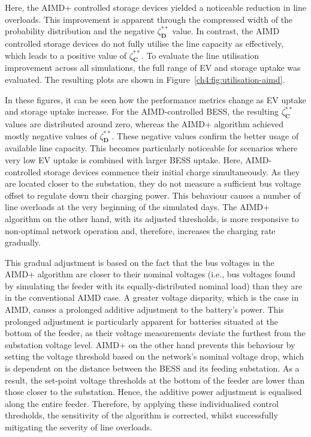 Here, the AIMD+ controlled storage devices yielded a noticeable reduction in line overloads. This improvement is apparent through the compressed width of the probability distribution and the negative $\zeta_\textbf{D}^{**}$ value. In contrast, the AIMD controlled storage devices do not fully utilise the line capacity as effectively, which leads to a positive value of $\zeta_\textbf{C}^{**}$. To evaluate the line utilisation improvement across all simulations, the full range of EV and storage uptake was evaluated. The resulting plots are shown in Figure~\ref{ch4:fig:utilisation-aimd}.



In these figures, it can be seen how the performance metrics change as EV uptake and storage uptake increase.
For the AIMD-controlled BESS, the resulting $\zeta_\textbf{C}^{**}$ values are distributed around zero, whereas the AIMD+ algorithm achieved mostly negative values of $\zeta_\textbf{D}^{**}$.
These negative values confirm the better usage of available line capacity. This becomes particularly noticeable for scenarios where very low EV uptake is combined with larger BESS uptake.
Here, AIMD-controlled storage devices commence their initial charge simultaneously.
As they are located closer to the substation, they do not measure a sufficient bus voltage offset to regulate down their charging power.
This behaviour causes a number of line overloads at the very beginning of the simulated days.
The AIMD+ algorithm on the other hand, with its adjusted thresholds, is more responsive to non-optimal network operation and, therefore, increases the charging rate gradually.

This gradual adjustment is based on the fact that the bus voltages in the AIMD+ algorithm are closer to their nominal voltages (i.e., bus voltages found by simulating the feeder with its equally-distributed nominal load) than they are in the conventional AIMD case.
A greater voltage disparity, which is the case in AIMD, causes a prolonged additive adjustment to the battery's power.
This prolonged adjustment is particularly apparent for batteries situated at the bottom of the feeder, as their voltage measurements deviate the furthest from the substation voltage level.
AIMD+ on the other hand prevents this behaviour by setting the voltage threshold based on the network's nominal voltage drop, which is dependent on the distance between the BESS and its feeding substation.
As a result, the set-point voltage thresholds at the bottom of the feeder are lower than those closer to the substation.
Hence, the additive power adjustment is equalised along the entire feeder.
Therefore, by applying these individualised control thresholds, the sensitivity of the algorithm is corrected, whilst successfully mitigating the severity of line overloads.

